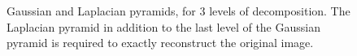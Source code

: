 \begin{figure}[htbp]
\centering\caption{Gaussian and Laplacian pyramids, for 3 levels of decomposition. The Laplacian pyramid in addition to the last level of the Gaussian pyramid is required to exactly reconstruct the original image.}%
 
 \hfill
 \hfill


\end{figure}
